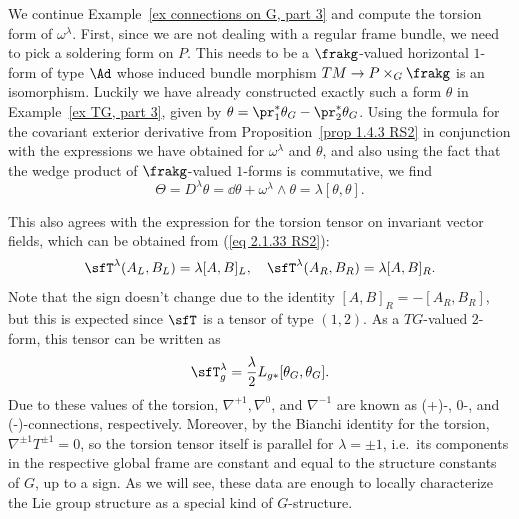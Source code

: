 \begin{example}\label{ex connections on G, part 4}
    We continue Example~\ref{ex connections on G, part 3} and compute the torsion form of $\omega^\lambda$. First, since we are not dealing with a regular frame bundle, we need to pick a soldering form on $P$. This needs to be a $\frakg$-valued horizontal $1$-form of type $\Ad$ whose induced bundle morphism $TM\to P\times_G \frakg$ is an isomorphism. Luckily we have already constructed exactly such a form $\theta$ in Example~\ref{ex TG, part 3}, given by $\theta=\pr_1^\ast\theta_G-\pr_2^\ast\theta_G$. 
    Using the formula for the covariant exterior derivative from Proposition~\ref{prop 1.4.3 RS2} in conjunction with the expressions we have obtained for $\omega^\lambda$ and $\theta$, and also using the fact that the wedge product of $\frakg$-valued $1$-forms is commutative, we find
    \[\Theta=D^\lambda \theta=\dd \theta+\omega^\lambda\wedge \theta=\lambda[\theta,\theta].\]

    This also agrees with the expression for the torsion tensor on invariant vector fields, which can be obtained from (\ref{eq 2.1.33 RS2}):
    \[\sfT^\lambda(A_L,B_L)=\lambda[A,B]_L,\quad \sfT^\lambda(A_R,B_R)=\lambda [A,B]_R.\]
    Note that the sign doesn't change due to the identity $[A,B]_R=-[A_R,B_R]$, but this is expected since $\sfT$ is a tensor of type $(1,2)$. 
    As a $TG$-valued $2$-form, this tensor can be written as 
    \[\sfT^\lambda_g=\frac{\lambda}{2} L_{g\ast}[\theta_G,\theta_G].\label{3791731}\]
    Due to these values of the torsion, $\nabla^{+1},\nabla^0$, and $\nabla^{-1}$ are known as (+)-, 0-, and (-)-connections, respectively. 
    Moreover, by the  Bianchi identity for the torsion, $\nabla^{\pm 1}T^{\pm 1}=0$, so the torsion tensor itself is parallel for $\lambda=\pm 1$, i.e.\ its components in the respective global frame are constant and equal to the structure constants of $G$, up to a sign. As we will see, these data are enough to locally characterize the Lie group structure as a special kind of $G$-structure.


\end{example}
